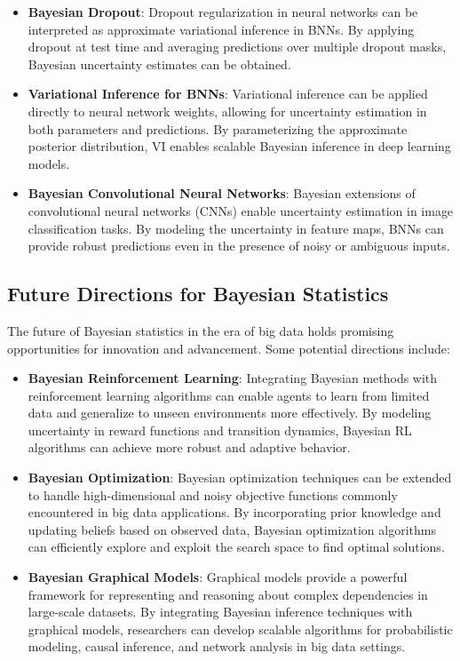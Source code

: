 \documentclass[12pt]{book} %
\begin{document}
\begin{itemize}
    \item \textbf{Bayesian Dropout}: Dropout regularization in neural networks can be interpreted as approximate variational inference in BNNs. By applying dropout at test time and averaging predictions over multiple dropout masks, Bayesian uncertainty estimates can be obtained.
    
    \item \textbf{Variational Inference for BNNs}: Variational inference can be applied directly to neural network weights, allowing for uncertainty estimation in both parameters and predictions. By parameterizing the approximate posterior distribution, VI enables scalable Bayesian inference in deep learning models.
    
    \item \textbf{Bayesian Convolutional Neural Networks}: Bayesian extensions of convolutional neural networks (CNNs) enable uncertainty estimation in image classification tasks. By modeling the uncertainty in feature maps, BNNs can provide robust predictions even in the presence of noisy or ambiguous inputs.
\end{itemize}

\subsection{Future Directions for Bayesian Statistics}
The future of Bayesian statistics in the era of big data holds promising opportunities for innovation and advancement. Some potential directions include:

\begin{itemize}
    \item \textbf{Bayesian Reinforcement Learning}: Integrating Bayesian methods with reinforcement learning algorithms can enable agents to learn from limited data and generalize to unseen environments more effectively. By modeling uncertainty in reward functions and transition dynamics, Bayesian RL algorithms can achieve more robust and adaptive behavior.
    
    \item \textbf{Bayesian Optimization}: Bayesian optimization techniques can be extended to handle high-dimensional and noisy objective functions commonly encountered in big data applications. By incorporating prior knowledge and updating beliefs based on observed data, Bayesian optimization algorithms can efficiently explore and exploit the search space to find optimal solutions.
    
    \item \textbf{Bayesian Graphical Models}: Graphical models provide a powerful framework for representing and reasoning about complex dependencies in large-scale datasets. By integrating Bayesian inference techniques with graphical models, researchers can develop scalable algorithms for probabilistic modeling, causal inference, and network analysis in big data settings.
\end{itemize}
\end{document}
